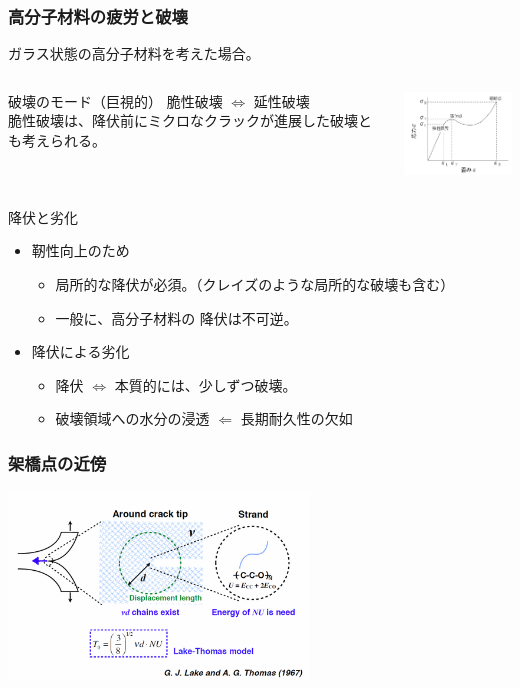 \documentclass[11pt, dvipdfmx]{beamer}
\begin{document}
\begin{appendix}
\begin{frame}
\frametitle{高分子材料の疲労と破壊}

ガラス状態の高分子材料を考えた場合。

\begin{columns}[totalwidth=1\textwidth]
\begin{block}{破壊のモード（巨視的）}
脆性破壊 $\Leftrightarrow$ 延性破壊\\
脆性破壊は、降伏前にミクロなクラックが進展した破壊とも考えられる。
\end{block}
	\centering
	\includegraphics[width=35mm]{./fig/S_S_Curve.png}
\end{columns}


\begin{exampleblock}{降伏と劣化}
	\begin{itemize}
	\item
	靭性向上のため
	\begin{itemize}
		\item
		{\color{red} 局所的な降伏}が必須。（クレイズのような局所的な破壊も含む）
		\item 
		一般に、高分子材料の{\color{red} 降伏は不可逆}。
	\end{itemize}
	\item
	降伏による劣化
		\begin{itemize}
			\item 
			降伏 $\Leftrightarrow$ {\color{red} 本質的には、少しずつ破壊。}
			\item
			{\color{red} 破壊領域への水分の浸透 $\Leftarrow$ 長期耐久性の欠如}
		\end{itemize}
	\end{itemize}
\end{exampleblock}
\end{frame}


\begin{frame}
\frametitle{架橋点の近傍}

\centering
\includegraphics[width=80mm]{./fig/Lake_Thomas.png}


\end{frame}
\end{appendix}
\end{document}
